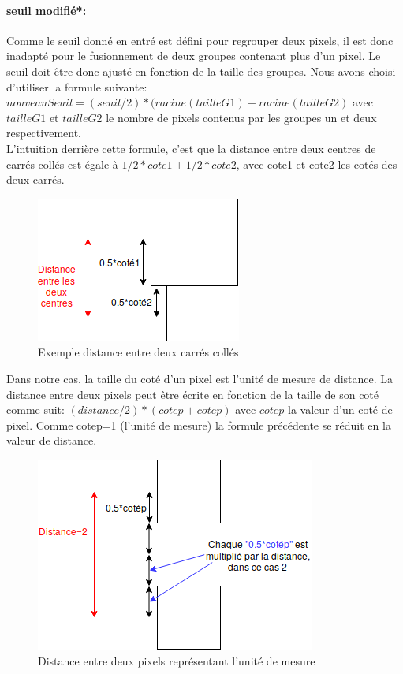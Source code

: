 \documentclass[12pt]{report}
\begin{document}
	\paragraph{seuil modifié*:}Comme le seuil donné en entré est défini pour regrouper deux pixels, il est donc inadapté pour le fusionnement de deux groupes contenant plus d’un pixel. Le seuil doit être donc ajusté en fonction de la taille des groupes. Nous avons choisi d’utiliser la formule suivante: \textbf{$nouveauSeuil = (seuil/2)*(racine(tailleG1)+racine(tailleG2)$} avec \textbf{$tailleG1$} et \textbf{$tailleG2$} le nombre de pixels contenus par les groupes un et deux respectivement.\\
	L’intuition derrière cette formule, c’est que la distance entre deux centres de carrés collés est égale à $1/2*cote1+1/2*cote2$, avec cote1 et cote2 les cotés des deux carrés.
	\begin{figure}[H]
		\centering
		\includegraphics[scale=0.75]{imgs/distanceSquares.png}
		\caption{Exemple distance entre deux carrés collés}
		\label{fig:DistanceSquares}
	\end{figure}
	Dans notre cas, la taille du coté d’un pixel est l’unité de mesure de distance. La distance entre deux pixels peut être écrite en fonction de la taille de son coté comme suit: \textbf{$(distance/2)*(cotep+cotep)$} avec \textbf{$cotep$} la valeur d’un coté de pixel. Comme cotep=1 (l’unité de mesure) la formule précédente se réduit en la valeur de distance.
	\begin{figure}[H]
		\centering
		\includegraphics[scale=0.75]{imgs/distancePixels.png}
		\caption{Distance entre deux pixels représentant l'unité de mesure}
		\label{fig:DistancePixels}
	\end{figure}
\end{document}
